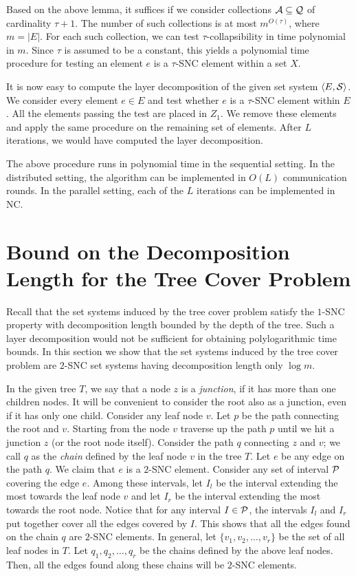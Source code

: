 \documentclass[11pt]{article}
\newcommand{\calA} {{\cal A}}
\newcommand{\calP} {{\cal P}}
\newcommand{\calQ} {{\cal Q}}
\newcommand{\calS} {{\cal S}}
\newcommand{\pair}[2] {\langle #1, #2\rangle}
\begin{document}
Based on the above lemma, it suffices if we consider collections $\calA\subseteq \calQ$ of cardinality $\tau+1$.
The number of such collections is at most $m^{O(\tau)}$, where $m=|E|$. 
For each such collection, we can test $\tau$-collapsibility 
in time polynomial in $m$.
Since $\tau$ is assumed to be a constant, 
this yields a polynomial time procedure for testing an element $e$ is a $\tau$-SNC element within a set $X$.

It is now easy to compute the layer decomposition of the given set system $\pair{E}{\calS}$.
We consider every element $e\in E$ and test whether $e$ is a $\tau$-SNC element within $E$.
All the elements passing the test are placed in $Z_1$.
We remove these elements and apply the same procedure on the remaining set of elements.
After $L$ iterations, we would have computed the layer decomposition.

The above procedure runs in polynomial time in the sequential setting.
In the distributed setting, the algorithm can be implemented in $O(L)$ communication rounds.
In the parallel setting, each of the $L$ iterations can be implemented in NC.

\section{Bound on the Decomposition Length for the Tree Cover Problem}
\label{sec:tree}
Recall that the set systems induced by the tree cover problem satisfy the $1$-SNC property 
with decomposition length bounded by the depth of the tree. 
Such a layer decomposition would not be sufficient for obtaining polylogarithmic time bounds.
In this section we show that the set systems induced by the tree cover problem are $2$-SNC set systems
having decomposition length only $\log m$.

In the given tree $T$, we say that a node $z$ is a {\em junction}, if it has more than one children nodes.
It will be convenient to consider the root also as a junction, even if it has only one child.
Consider any leaf node $v$. Let $p$ be the path connecting the root and $v$. 
Starting from the node $v$ traverse up the path $p$
until we hit a junction $z$ (or the root node itself). Consider the path $q$ connecting $z$ and $v$;
we call $q$ as the {\em chain} defined by the leaf node $v$ in the tree $T$.
Let $e$ be any edge on the path $q$. We claim that $e$ is a $2$-SNC element.
Consider any set of interval $\calP$ covering the edge $e$.
Among these intervals, let $I_l$ be the interval extending the most towards the leaf node $v$
and let $I_r$ be the interval extending the most towards the root node.
Notice that for any interval $I\in \calP$, the intervals $I_l$ and $I_r$ put together cover
all the edges covered by $I$. This shows that all the edges found on the chain $q$ are $2$-SNC elements.
In general, let $\{v_1, v_2, \ldots, v_r\}$ be the set of all leaf nodes in $T$.
Let $q_1, q_2, \ldots, q_r$ be the chains defined by the above leaf nodes.
Then, all the edges found along these chains will be $2$-SNC elements.
\end{document}
